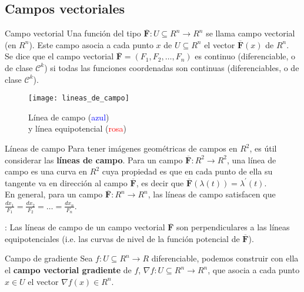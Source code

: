 \documentclass[a4paper, twoside]{article}
\numberwithin{equation}{section}
\numberwithin{figure}{section}
\numberwithin{table}{section}
\newcommand{\vect}[1]{\overline{\textbf{#1}}}
\begin{document}
\subsection{Campos vectoriales}
\begin{minipage}{0.6\textwidth}
	\begin{definicion*}{Campo vectorial}
		Una función del tipo $\vect{F}: U \subseteq R^n \to R^n$ se llama campo vectorial (en $R^n$). Este campo asocia a cada punto $x$ de $U \subseteq R^n$ el vector $\vect{F}(x)$ de $R^n$.\\
		
		Se dice que el campo vectorial $\vect{F}=(F_1,F_2,\ldots,F_n)$ es continuo (diferenciable, o de clase $\mathcal{C}^{k}$) si todas las funciones coordenadas son continuas (diferenciables, o de clase $\mathcal{C}^{k}$).
	\end{definicion*}
\end{minipage}
\begin{minipage}{0.3\textwidth}
	\begin{figure}[H]
		\centering
		\texttt{[image: lineas\_de\_campo]}
		\caption{{\scriptsize Línea de campo (\textcolor{blue}{azul}) \\ y línea equipotencial (\textcolor{red}{rosa})}}
	\end{figure}
\end{minipage}

\begin{definicion*}{Líneas de campo}
	Para tener imágenes geométricas de campos en $R^2$, es útil considerar las \textbf{líneas de campo}. Para un campo $\vect{F}: R^2 \to R^2$, una línea de campo es una curva en $R^2$ cuya propiedad es que en cada punto de ella su tangente va en dirección al campo $\vect{F}$, es decir que $\vect{F}(\lambda(t))=\lambda^\prime(t)$.\\
	
	En general, para un campo $\vect{F}: R^n \to R^n$, las líneas de campo satisfacen que $\frac{dx_1}{F_1} = \frac{dx_2}{F_2} = \ldots = \frac{dx_n}{F_n}$.
	
	: Las líneas de campo de un campo vectorial $\vect{F}$ son perpendiculares a las líneas equipotenciales (i.e. las curvas de nivel de la función potencial de $\vect{F}$).
\end{definicion*}

\begin{definicion*}{Campo de gradiente}
	Sea $f: U \subseteq R^n \to R$ diferenciable, podemos construir con ella el \textbf{campo vectorial gradiente} de $f$, $\nabla f: U \subseteq R^n \to R^n$, que asocia a cada punto $x \in U$ el vector $\nabla f(x) \in R^n$.
\end{definicion*}
\end{document}
